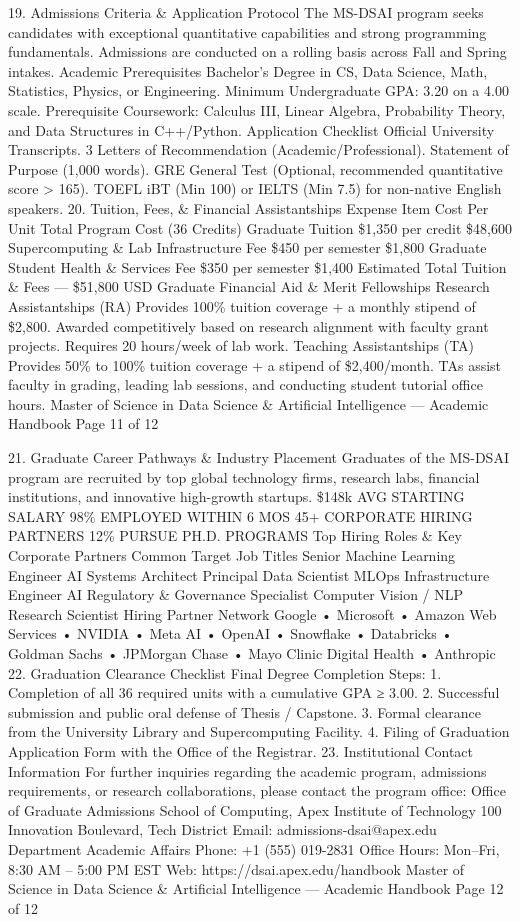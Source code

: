 19. Admissions Criteria \& Application Protocol
The MS-DSAI program seeks candidates with exceptional quantitative capabilities and strong programming
fundamentals. Admissions are conducted on a rolling basis across Fall and Spring intakes.
Academic Prerequisites
Bachelor’s Degree in CS, Data Science, Math, Statistics,
Physics, or Engineering.
Minimum Undergraduate GPA: 3.20 on a 4.00 scale.
Prerequisite Coursework: Calculus III, Linear Algebra,
Probability Theory, and Data Structures in C++/Python.
Application Checklist
Official University Transcripts.
3 Letters of Recommendation (Academic/Professional).
Statement of Purpose (1,000 words).
GRE General Test (Optional, recommended quantitative
score > 165).
TOEFL iBT (Min 100) or IELTS (Min 7.5) for non-native
English speakers.
20. Tuition, Fees, \& Financial Assistantships
Expense Item
Cost Per Unit
Total Program Cost (36 Credits)
Graduate Tuition
\$1,350 per credit
\$48,600
Supercomputing \& Lab Infrastructure Fee
\$450 per semester
\$1,800
Graduate Student Health \& Services Fee
\$350 per semester
\$1,400
Estimated Total Tuition \& Fees
—
\$51,800 USD
Graduate Financial Aid \& Merit Fellowships
Research Assistantships (RA)
Provides 100\% tuition coverage + a monthly stipend of \$2,800.
Awarded competitively based on research alignment with
faculty grant projects. Requires 20 hours/week of lab work.
Teaching Assistantships (TA)
Provides 50\% to 100\% tuition coverage + a stipend of
\$2,400/month. TAs assist faculty in grading, leading lab
sessions, and conducting student tutorial office hours.
Master of Science in Data Science \& Artificial Intelligence — Academic Handbook
Page 11 of 12

21. Graduate Career Pathways \& Industry Placement
Graduates of the MS-DSAI program are recruited by top global technology firms, research labs, financial institutions,
and innovative high-growth startups.
\$148k
AVG STARTING SALARY
98\%
EMPLOYED WITHIN 6
MOS
45+
CORPORATE HIRING
PARTNERS
12\%
PURSUE PH.D.
PROGRAMS
Top Hiring Roles \& Key Corporate Partners
Common Target Job Titles
Senior Machine Learning Engineer
AI Systems Architect
Principal Data Scientist
MLOps Infrastructure Engineer
AI Regulatory \& Governance Specialist
Computer Vision / NLP Research Scientist
Hiring Partner Network
Google • Microsoft • Amazon Web Services • NVIDIA • Meta AI
• OpenAI • Snowflake • Databricks • Goldman Sachs •
JPMorgan Chase • Mayo Clinic Digital Health • Anthropic
22. Graduation Clearance Checklist
Final Degree Completion Steps:
1. Completion of all 36 required units with a cumulative GPA ≥ 3.00.
2. Successful submission and public oral defense of Thesis / Capstone.
3. Formal clearance from the University Library and Supercomputing Facility.
4. Filing of Graduation Application Form with the Office of the Registrar.
23. Institutional Contact Information
For further inquiries regarding the academic program, admissions requirements, or research collaborations, please contact
the program office:
Office of Graduate Admissions
School of Computing, Apex Institute of Technology
100 Innovation Boulevard, Tech District
Email: admissions-dsai@apex.edu
Department Academic Affairs
Phone: +1 (555) 019-2831
Office Hours: Mon–Fri, 8:30 AM – 5:00 PM EST
Web: https://dsai.apex.edu/handbook
Master of Science in Data Science \& Artificial Intelligence — Academic Handbook
Page 12 of 12
